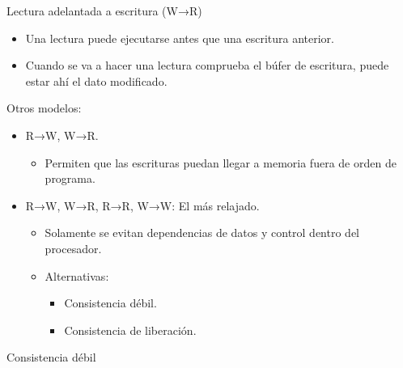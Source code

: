 \documentclass[12pt, twoside, openright]{report} %
\begin{document}
    Lectura adelantada a escritura (W→R)

    \begin{itemize}
    
    \item
      Una lectura puede ejecutarse antes que una escritura anterior.
    \item
      Cuando se va a hacer una lectura comprueba el búfer de
      escritura, puede estar ahí el dato modificado.
    \end{itemize}

    Otros modelos:

    \begin{itemize}
    
    \item
      R→W, W→R.

      \begin{itemize}
      
      \item
        Permiten que las escrituras puedan llegar a memoria fuera de
        orden de programa.
      \end{itemize}
    \item
      R→W, W→R, R→R, W→W: El más relajado.

      \begin{itemize}
      
      \item
        Solamente se evitan dependencias de datos y control dentro del
        procesador.
      \item
        Alternativas:

        \begin{itemize}
        
        \item
          Consistencia débil.
        \item
          Consistencia de liberación.
        \end{itemize}
      \end{itemize}
    \end{itemize}

    Consistencia débil
\end{document}
